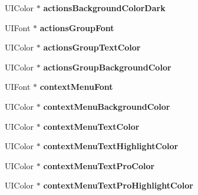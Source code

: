 \begin{DoxyCompactItemize}
\mbox{\label{category_l_u_theme_07_08_a7cc4ef3639d6effd634616cbdc6dbea8}} 
U\+I\+Color $\ast$ {\bfseries actions\+Background\+Color\+Dark}
\item 
\mbox{\label{category_l_u_theme_07_08_a855cae16d2d062f2feaa0e39b7572ca1}} 
U\+I\+Font $\ast$ {\bfseries actions\+Group\+Font}
\item 
\mbox{\label{category_l_u_theme_07_08_ac674e8da5162ae682ad62d887db58e35}} 
U\+I\+Color $\ast$ {\bfseries actions\+Group\+Text\+Color}
\item 
\mbox{\label{category_l_u_theme_07_08_a72b9f1b28546eb319f759f8bc9279784}} 
U\+I\+Color $\ast$ {\bfseries actions\+Group\+Background\+Color}
\item 
\mbox{\label{category_l_u_theme_07_08_aebbd4fe436380e3ccc3900d616db4b0b}} 
U\+I\+Font $\ast$ {\bfseries context\+Menu\+Font}
\item 
\mbox{\label{category_l_u_theme_07_08_a29de63fb683198f2c7d7769e151c81fc}} 
U\+I\+Color $\ast$ {\bfseries context\+Menu\+Background\+Color}
\item 
\mbox{\label{category_l_u_theme_07_08_a3814a5785e136e284c31d7cd5218f774}} 
U\+I\+Color $\ast$ {\bfseries context\+Menu\+Text\+Color}
\item 
\mbox{\label{category_l_u_theme_07_08_aad15d10056dd39ee153b105a5ad3cad6}} 
U\+I\+Color $\ast$ {\bfseries context\+Menu\+Text\+Highlight\+Color}
\item 
\mbox{\label{category_l_u_theme_07_08_af93720c90efe17915d5784aacf8687c1}} 
U\+I\+Color $\ast$ {\bfseries context\+Menu\+Text\+Pro\+Color}
\item 
\mbox{\label{category_l_u_theme_07_08_a79d7562c05a2585ffcbe73ca8a4171a3}} 
U\+I\+Color $\ast$ {\bfseries context\+Menu\+Text\+Pro\+Highlight\+Color}
\item 
\mbox{\label{category_l_u_theme_07_08_aceb4331c3b01d4614b470594ace863bc}} 

\end{DoxyCompactItemize}
